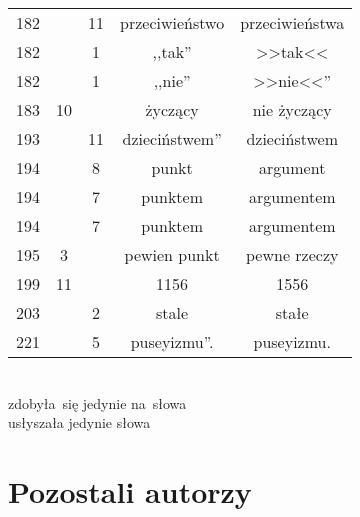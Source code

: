 \documentclass[a4paper,11pt]{article}
\begin{document}
\begin{center}
\begin{tabular}{|c|c|c|c|c|}
    182 & & 11 & przeciwieństwo & przeciwieństwa \\
    182 & &  1 & ,,tak'' & >>tak<<  %
    \\
    182 & &  1 & ,,nie'' & >>nie<<''  %
    \\
    183 & 10 & & życzący & nie życzący \\
    193 & & 11 & dzieciństwem'' & dzieciństwem \\
    194 & &  8 & punkt & argument \\
    194 & &  7 & punktem & argumentem \\
    194 & &  7 & punktem & argumentem \\
    195 &  3 & & pewien punkt & pewne rzeczy \\
    199 & 11 & & 1156 & 1556 \\
    203 & &  2 & stale & stałe \\
    221 & &  5 & puseyizmu''. & puseyizmu. \\
    \hline
  \end{tabular}
\end{center}
\noi
{} \\
\Jest zdobyła~się jedynie na~słowa \\
\Pow  usłyszała jedynie słowa \\

\vspace{\spaceTwo}





\newpage
\section{Pozostali autorzy}

\vspace{\spaceTwo}




\end{document}
